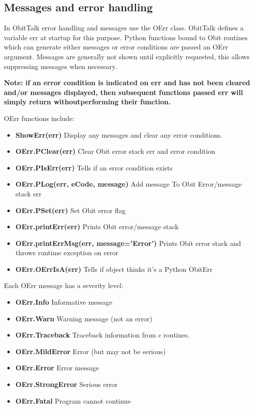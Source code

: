 \documentclass[11pt]{report}
\begin{document}
\subsection{Messages and error handling}
In ObitTalk error handling and messages use the OErr class.
ObitTalk defines a variable err at startup for this purpose.
Python functions bound to Obit routines which can generate either
messages or error conditions are passed an OErr argument.
Messages are generally not shown until explicitly requested, this
allows suppressing messages when necessary.

{\bf Note: if an error condition is indicated on err and has not been
cleared and/or messages displayed, then subsequent functions passed
err will simply return withoutperforming their function.}

OErr functions include:
\begin{itemize}
\item {\bf ShowErr(err)} Display any messages and clear any error conditions.
\item {\bf OErr.PClear(err)} Clear Obit error stack err and error condition
\item {\bf OErr.PIsErr(err)} Tells if an error condition exists
\item {\bf OErr.PLog(err, eCode, message)} Add message To Obit
Error/message stack err
\item {\bf OErr.PSet(err)} Set Obit error flag
\item {\bf OErr.printErr(err)} Prints Obit error/message stack
\item {\bf OErr.printErrMsg(err, message='Error')} Prints Obit error
stack and throws runtime exception on error 
\item {\bf OErr.OErrIsA(err)} Tells if object thinks it's a Python ObitErr
\end{itemize}

Each OErr message has a severity level:
\begin{itemize}
\item {\bf OErr.Info} Informative message
\item {\bf OErr.Warn} Warning message (not an error)
\item {\bf OErr.Traceback} Traceback information from c routines.
\item {\bf OErr.MildError} Error (but may not be serious)
\item {\bf OErr.Error} Error message
\item {\bf OErr.StrongError} Serious error
\item {\bf OErr.Fatal} Program cannot continue
\end{itemize}
\end{document}
